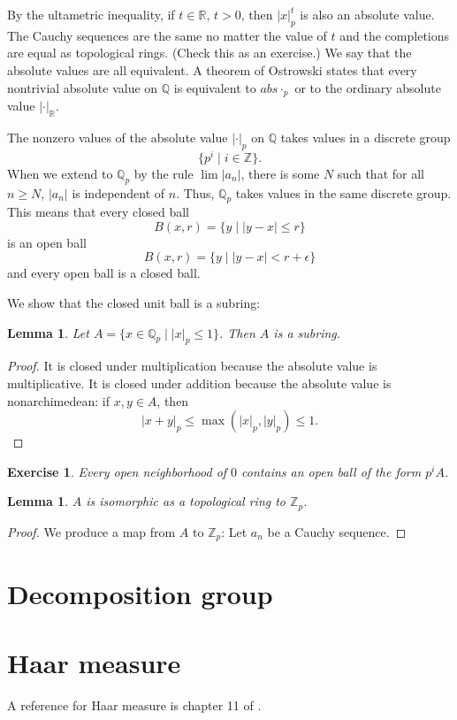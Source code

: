 \documentclass{amsart}
\newcommand{\ring}[1]{\mathbb{#1}}
\newtheorem{lemma}[equation]{Lemma}
\newtheorem{exercise}{Exercise}
\def\abs#1{{|#1|}}
\begin{document}
By the ultametric inequality, if $t\in \ring{R}$, $t>0$, then
$\abs{x}_p^t$ is also an absolute value.  The Cauchy sequences are the
same no matter the value of $t$ and the completions are equal as
topological rings.  (Check this as an exercise.)  We say that the
absolute values are all equivalent.  A theorem of Ostrowski
\cite[Theorem 6.15]{knapp-advanced} states that every nontrivial
absolute value on $\ring{Q}$ is equivalent to $abs{\cdot}_p$ or to the
ordinary absolute value $\abs{\cdot}_{\ring{R}}$.

The nonzero values of the
absolute value $\abs{\cdot}_p$ on $\ring{Q}$ takes values in a discrete group
\[
\{p^i \mid i\in \ring{Z}\}.
\]
When we extend to $\ring{Q}_p$ by the rule $\lim \abs{a_n}$, there is some
$N$ such that for all $n\ge N$, $\abs{a_n}$ is independent of $n$.
Thus, $\ring{Q}_p$ takes values in the same discrete group.
This means that every closed ball 
\[
B(x,r) = \{y\mid \abs{y-x}\le r\}
\]
is an open ball
\[
B(x,r) = \{y\mid \abs{y-x}< r+\epsilon\}
\]
and every open ball is a closed ball.

We show that the closed unit ball is a subring:

\begin{lemma}
Let $A = \{x\in \ring{Q}_p \mid \abs{x}_p\le 1\}$.
Then $A$ is a subring.
\end{lemma}

\begin{proof} It is closed under multiplication because the absolute
value is multiplicative.  It is closed under addition because the absolute
value is nonarchimedean:  if $x,y\in A$, then
\[
\abs{x + y}_p \le \max(\abs{x}_p,\abs{y}_p)\le 1.
\]
\end{proof}

\begin{exercise} Every open neighborhood of $0$ contains an open ball of the
form $p^i A$.
\end{exercise}


\begin{lemma}  $A$ is isomorphic as a topological ring to $\ring{Z}_p$.
\end{lemma}

\begin{proof}
We produce a map from $A$ to $\ring{Z}_p$:  Let $a_n$ be a Cauchy sequence.
\end{proof}

\newpage
\section{Decomposition group}

\section{Haar measure}

A reference for Haar measure is chapter 11 of \cite{Halmos-measure}.




\raggedright


\end{document}
